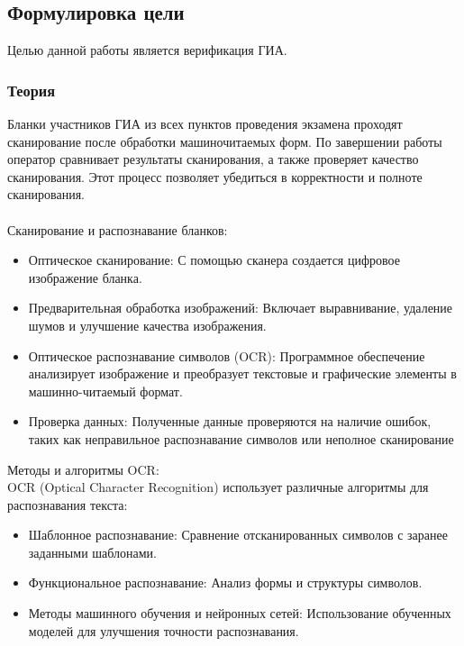 \documentclass[12pt,a4paper]{scrartcl}
\begin{document}
\subsection{Формулировка цели}
Целью данной работы является верификация ГИА.

\subsubsection{Теория}
Бланки участников ГИА из всех пунктов проведения экзамена проходят сканирование после обработки машиночитаемых форм. По завершении работы оператор сравнивает результаты сканирования, а также проверяет качество сканирования. Этот процесс позволяет убедиться в корректности и полноте сканирования.\\
\\
Сканирование и распознавание бланков:

\begin{itemize}
    \item Оптическое сканирование: С помощью сканера создается цифровое изображение бланка. \\
    \item Предварительная обработка изображений: Включает выравнивание, удаление шумов и улучшение качества изображения.\\
    \item Оптическое распознавание символов (OCR): Программное обеспечение анализирует изображение и преобразует текстовые и графические элементы в машинно-читаемый формат.\\
    \item Проверка данных: Полученные данные проверяются на наличие ошибок, таких как неправильное распознавание символов или неполное сканирование\\
\end{itemize}

Методы и алгоритмы OCR:\\
OCR (Optical Character Recognition) использует различные алгоритмы для распознавания текста:

\begin{itemize}
    \item Шаблонное распознавание: Сравнение отсканированных символов с заранее заданными шаблонами.\\
    \item Функциональное распознавание: Анализ формы и структуры символов.\\
    \item Методы машинного обучения и нейронных сетей: Использование обученных моделей для улучшения точности распознавания.\\
\end{itemize}
\end{document}
